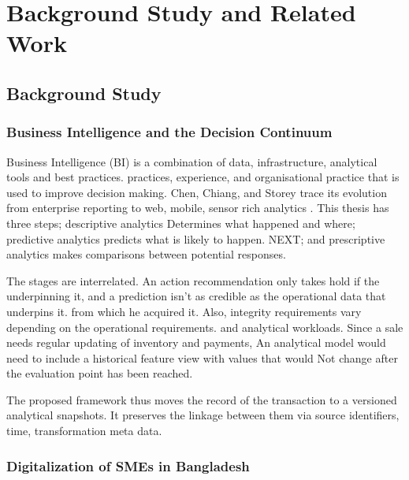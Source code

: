 \documentclass[a4paper,11pt,oneside]{book}
\makeatletter
\def\cleardoublepage{\clearpage\if@twoside \ifodd\c@page\else
\hbox{}
\thispagestyle{empty}
\newpage
\if@twocolumn\hbox{}\newpage\fi\fi\fi}
\theoremstyle{plain}
\theoremstyle{definition}
\theoremstyle{remark}
\makeatother
\begin{document}
\cleardoublepage

\chapter{Background Study and Related Work}
\label{chapter_backStudy}

\section{Background Study}

\subsection{Business Intelligence and the Decision Continuum}

Business Intelligence (BI) is a combination of data, infrastructure, analytical tools and best practices. practices, experience, and organisational practice that is used to improve decision making. Chen, Chiang, and Storey trace its evolution from enterprise reporting to web, mobile, sensor rich analytics \cite{chen2012business}. This thesis has three steps; descriptive analytics Determines what happened and where; predictive analytics predicts what is likely to happen. NEXT; and prescriptive analytics makes comparisons between potential responses.

The stages are interrelated. An action recommendation only takes hold if the underpinning it, and a prediction isn't as credible as the operational data that underpins it. from which he acquired it. Also, integrity requirements vary depending on the operational requirements. and analytical workloads. Since a sale needs regular updating of inventory and payments, An analytical model would need to include a historical feature view with values that would Not change after the evaluation point has been reached.

The proposed framework thus moves the record of the transaction to a versioned analytical snapshots. It preserves the linkage between them via source identifiers, time, transformation meta data.

\subsection{Digitalization of SMEs in Bangladesh}
\end{document}
